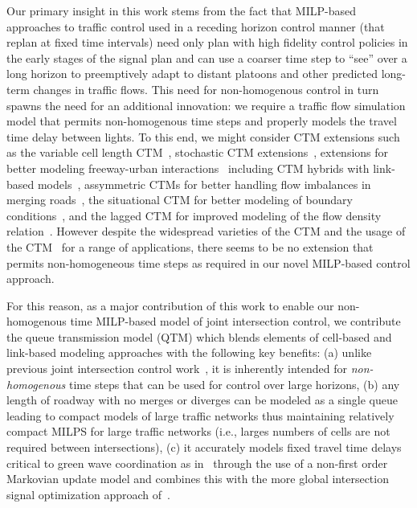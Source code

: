 Our primary insight in this work stems from the fact that MILP-based
approaches to traffic control used in a receding horizon control
manner (that replan at fixed time intervals) need only plan with high
fidelity control policies in the early stages of the signal plan and
can use a coarser time step to ``see'' over a long horizon to
preemptively adapt to distant platoons and other predicted long-term
changes in traffic flows.  This need for non-homogenous control in
turn spawns the need for an additional innovation: we require a
traffic flow simulation model that permits non-homogenous time steps
and properly models the travel time delay between lights.  To this
end, we might consider CTM extensions such as the variable cell length
CTM~, stochastic CTM
extensions~,
extensions for better modeling freeway-urban
interactions~ including CTM hybrids with
link-based models~, assymmetric CTMs
for better handling flow imbalances in merging
roads~, the situational CTM for better
modeling of boundary conditions~, and the
lagged CTM for improved modeling of the flow density
relation~.  However despite the widespread
varieties of the CTM and the usage of the
CTM~ for a range of applications,
there seems to be no extension that permits non-homogeneous time steps
as required in our novel MILP-based control approach.

For this reason, as a major contribution of this work to enable our
non-homogenous time MILP-based model of joint intersection control, we
contribute the queue transmission model (QTM) which blends elements of
cell-based and link-based modeling approaches with the following key
benefits: (a) unlike previous joint intersection control work~,
it is inherently intended for \emph{non-homogenous} time steps that can be used for control over large horizons,
(b) any length of roadway with no merges or diverges can be modeled as
a single queue leading to compact models of large traffic networks thus maintaining relatively
compact MILPS for large traffic networks (i.e., larges numbers of cells are not required between intersections),
(c) it accurately models fixed travel time delays critical to green
wave coordination as
in~
through the use of a non-first order Markovian update model and
combines this with the more global intersection signal optimization
approach of~.

